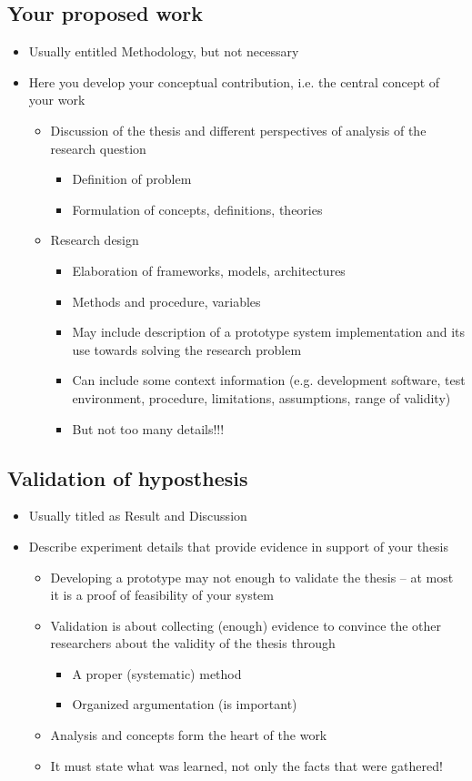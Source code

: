 \documentclass[twoside]{utmthesis}
\begin{document}
\subsection{Your proposed work}
\begin{itemize}
\item Usually entitled Methodology, but not necessary
\item Here you develop your conceptual contribution, i.e. the central concept
of your work
\begin{itemize}
\item Discussion of the thesis and different perspectives of analysis of
the research question
\begin{itemize}
\item Definition of problem
\item Formulation of concepts, definitions, theories
\end{itemize}
\item Research design
\begin{itemize}
\item Elaboration of frameworks, models, architectures
\item Methods and procedure, variables
\item May include description of a prototype system implementation and its
use towards solving the research problem 
\item Can include some context information (e.g. development software, test
environment, procedure, limitations, assumptions, range of validity)
\item But not too many details!!!
\end{itemize}
\end{itemize}
\end{itemize}

\subsection{Validation of hyposthesis}
\begin{itemize}
\item Usually titled as Result and Discussion
\item Describe experiment details that provide evidence in support of your
thesis
\begin{itemize}
\item Developing a prototype may not enough to validate the thesis -- at
most it is a proof of feasibility of your system
\item Validation is about collecting (enough) evidence to convince the other
researchers about the validity of the thesis through
\begin{itemize}
\item A proper (systematic) method
\item Organized argumentation (is important)
\end{itemize}
\item Analysis and concepts form the heart of the work
\item It must state what was learned, not only the facts that were gathered! 
\end{itemize}
\end{itemize}
\end{document}
